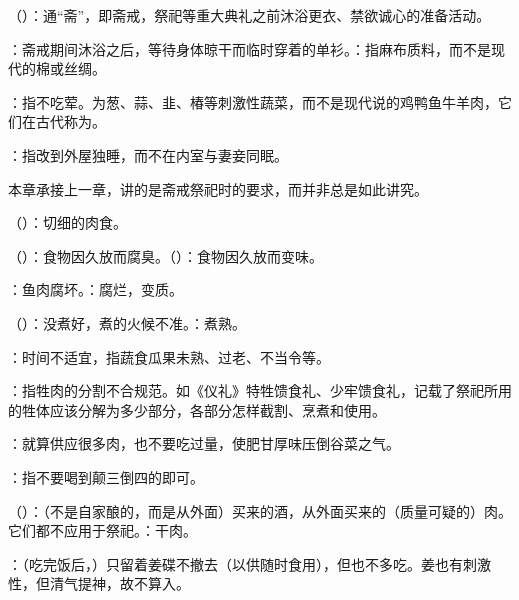 {
\item {}（）：通“斋”，即斋戒，祭祀等重大典礼之前沐浴更衣、禁欲诚心的准备活动。
\item {}：斋戒期间沐浴之后，等待身体晾干而临时穿着的单衫。：指麻布质料，而不是现代的棉或丝绸。
\item {}：指不吃荤。为葱、蒜、韭、椿等刺激性蔬菜，而不是现代说的鸡鸭鱼牛羊肉，它们在古代称为。%
\item {}：指改到外屋独睡，而不在内室与妻妾同眠。
}
{}


{
本章承接上一章，讲的是斋戒祭祀时的要求，而并非总是如此讲究。
\begin{lyblobitemize}
\item {}（）：切细的肉食。
\item {}（）：食物因久放而腐臭。（）：食物因久放而变味。

：鱼肉腐坏。：腐烂，变质。
\item {}（）：没煮好，煮的火候不准。：煮熟。

：时间不适宜，指蔬食瓜果未熟、过老、不当令等。

：指牲肉的分割不合规范。如《仪礼》特牲馈食礼、少牢馈食礼，记载了祭祀所用的牲体应该分解为多少部分，各部分怎样截割、烹煮和使用。
\item {}：就算供应很多肉，也不要吃过量，使肥甘厚味压倒谷菜之气。
\item {}：指不要喝到颠三倒四的即可。
\item {}（）：（不是自家酿的，而是从外面）买来的酒，从外面买来的（质量可疑的）肉。它们都不应用于祭祀。：干肉。
\item {}：（吃完饭后，）只留着姜碟不撤去（以供随时食用），但也不多吃。姜也有刺激性，但清气提神，故不算入。
\end{lyblobitemize}
}
{}



